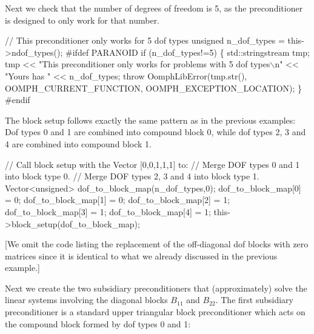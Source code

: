 Next we check that the number of degrees of freedom is 5, as the preconditioner is designed to only work for that number.


\begin{DoxyCodeInclude}
  \textcolor{comment}{// This preconditioner only works for 5 dof types}
  \textcolor{keywordtype}{unsigned} n\_dof\_types = this->ndof\_types();
\textcolor{preprocessor}{#ifdef PARANOID}
  \textcolor{keywordflow}{if} (n\_dof\_types!=5)
   \{
    std::stringstream tmp;
    tmp << \textcolor{stringliteral}{"This preconditioner only works for problems with 5 dof types\(\backslash\)n"}
        << \textcolor{stringliteral}{"Yours has "} << n\_dof\_types;
    \textcolor{keywordflow}{throw} OomphLibError(tmp.str(),
                        OOMPH\_CURRENT\_FUNCTION,
                        OOMPH\_EXCEPTION\_LOCATION);
   \}
\textcolor{preprocessor}{#endif}

\end{DoxyCodeInclude}


The block setup follows exactly the same pattern as in the previous examples\+: Dof types 0 and 1 are combined into compound block 0, while dof types 2, 3 and 4 are combined into compound block 1.


\begin{DoxyCodeInclude}
  \textcolor{comment}{// Call block setup with the Vector [0,0,1,1,1] to:}
  \textcolor{comment}{// Merge DOF types 0 and 1 into block type 0.}
  \textcolor{comment}{// Merge DOF types 2, 3 and 4 into block type 1.}
  Vector<unsigned> dof\_to\_block\_map(n\_dof\_types,0);
  dof\_to\_block\_map[0] = 0;
  dof\_to\_block\_map[1] = 0;
  dof\_to\_block\_map[2] = 1;
  dof\_to\_block\_map[3] = 1;
  dof\_to\_block\_map[4] = 1;
  this->block\_setup(dof\_to\_block\_map);

\end{DoxyCodeInclude}


\mbox{[}We omit the code listing the replacement of the off-\/diagonal dof blocks with zero matrices since it is identical to what we already discussed in the previous example.\mbox{]}

Next we create the two subsidiary preconditioners that (approximately) solve the linear systems involving the diagonal blocks $ B_{11} $ and $ B_{22} $. The first subsidiary preconditioner is a standard upper triangular block preconditioner which acts on the compound block formed by dof types 0 and 1\+:


